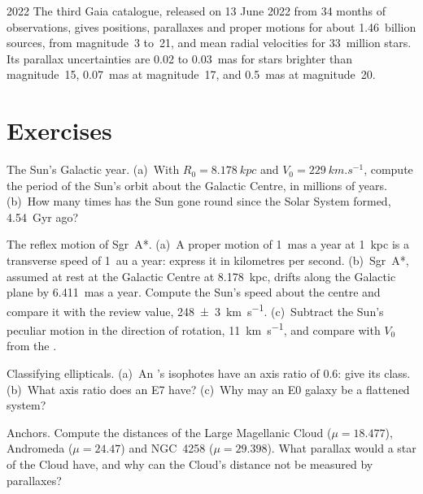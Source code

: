 \begin{dated}{2022}
The third Gaia catalogue, released on 13 June 2022 from 34 months of
observations, gives positions, parallaxes and proper motions for about
1.46~billion sources, from magnitude~3 to~21, and mean radial velocities
for 33~million stars. Its parallax uncertainties are 0.02 to
\qty{0.03}{mas} for stars brighter than magnitude~15, \qty{0.07}{mas} at
magnitude~17, and \qty{0.5}{mas} at magnitude~20.
\end{dated}

\section{Exercises}

\begin{exercise}[$\star$]\label{exo:b3:milky-way-galaxies:1}
The Sun's Galactic year. (a)~With $R_0 = \qty{8.178}{kpc}$ and
$V_0 = \qty{229}{km.s^{-1}}$, compute the period of the Sun's orbit about
the Galactic Centre, in millions of years. (b)~How many times has the Sun
gone round since the Solar System formed, \qty{4.54}{Gyr} ago?
\end{exercise}

\begin{exercise}[$\star$]\label{exo:b3:milky-way-galaxies:2}
The reflex motion of Sgr~A*. (a)~A proper motion of \qty{1}{mas} a year
at \qty{1}{kpc} is a transverse speed of \qty{1}{au} a year: express it in
kilometres per second. (b)~Sgr~A*, assumed at rest at the Galactic Centre
at \qty{8.178}{kpc}, drifts along the Galactic plane by \qty{6.411}{mas}
a year. Compute the Sun's speed about the centre and compare it with the
review value, \qty[separate-uncertainty=true]{248 \pm 3}{km.s^{-1}}. (c)~Subtract the Sun's
peculiar motion in the direction of rotation, \qty{11}{km.s^{-1}}, and
compare with $V_0$ from the .
\end{exercise}

\begin{exercise}[$\star$]\label{exo:b3:milky-way-galaxies:3}
Classifying ellipticals. (a)~An 's isophotes have an
axis ratio of 0.6: give its class. (b)~What axis ratio does an E7 have?
(c)~Why may an E0 galaxy be a flattened system?
\end{exercise}

\begin{exercise}[$\star$]\label{exo:b3:milky-way-galaxies:4}
Anchors. Compute the distances of the Large Magellanic Cloud
($\mu = 18.477$), Andromeda ($\mu = 24.47$) and NGC~4258
($\mu = 29.398$). What parallax would a star of the Cloud have, and why
can the Cloud's distance not be measured by parallaxes?
\end{exercise}

